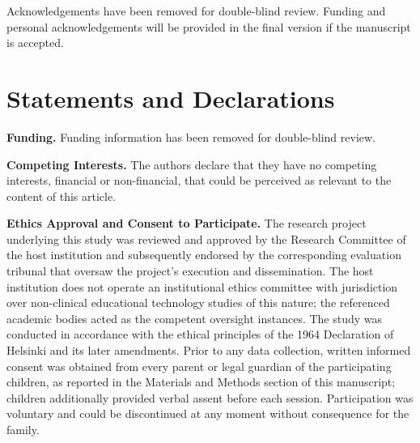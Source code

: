 \documentclass[pdflatex,sn-apa]{sn-jnl}%
\begin{document}
\maketitle





\backmatter

    Acknowledgements have been removed for double-blind review. Funding and personal acknowledgements will be provided in the final version if the manuscript is accepted.

\section*{Statements and Declarations}

    \textbf{Funding.}
        Funding information has been removed for double-blind review.

    \textbf{Competing Interests.}
        The authors declare that they have no competing interests, financial or non-financial, that could be perceived as relevant to the content of this article.

    \textbf{Ethics Approval and Consent to Participate.}
        The research project underlying this study was reviewed and approved by the Research Committee of the host institution and subsequently endorsed by the corresponding evaluation tribunal that oversaw the project's execution and dissemination. The host institution does not operate an institutional ethics committee with jurisdiction over non-clinical educational technology studies of this nature; the referenced academic bodies acted as the competent oversight instances. The study was conducted in accordance with the ethical principles of the 1964 Declaration of Helsinki and its later amendments. Prior to any data collection, written informed consent was obtained from every parent or legal guardian of the participating children, as reported in the Materials and Methods section of this manuscript; children additionally provided verbal assent before each session. Participation was voluntary and could be discontinued at any moment without consequence for the family.
\end{document}

